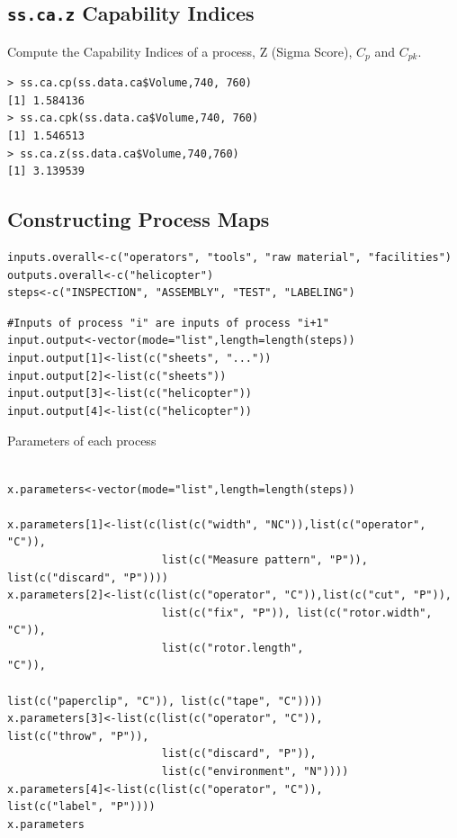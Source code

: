 \documentclass[]{article}
\begin{document}
\subsection{\texttt{ss.ca.z} Capability Indices}

Compute the Capability Indices of a process, Z (Sigma Score), $C_p$ and $C_{pk}$.
\begin{verbatim}
> ss.ca.cp(ss.data.ca$Volume,740, 760)
[1] 1.584136
> ss.ca.cpk(ss.data.ca$Volume,740, 760)
[1] 1.546513
> ss.ca.z(ss.data.ca$Volume,740,760)
[1] 3.139539
\end{verbatim}



\newpage
\subsection{Constructing Process Maps}
\begin{framed}
\begin{verbatim}
inputs.overall<-c("operators", "tools", "raw material", "facilities")
outputs.overall<-c("helicopter")
steps<-c("INSPECTION", "ASSEMBLY", "TEST", "LABELING")
\end{verbatim}
\end{framed}

\begin{framed}
\begin{verbatim}
#Inputs of process "i" are inputs of process "i+1"
input.output<-vector(mode="list",length=length(steps))
input.output[1]<-list(c("sheets", "..."))
input.output[2]<-list(c("sheets"))
input.output[3]<-list(c("helicopter"))
input.output[4]<-list(c("helicopter"))
\end{verbatim}
\end{framed}
Parameters of each process
\begin{framed}
\begin{verbatim}

x.parameters<-vector(mode="list",length=length(steps))

x.parameters[1]<-list(c(list(c("width", "NC")),list(c("operator", "C")),
                        list(c("Measure pattern", "P")), list(c("discard", "P"))))
x.parameters[2]<-list(c(list(c("operator", "C")),list(c("cut", "P")),
                        list(c("fix", "P")), list(c("rotor.width", "C")),
                        list(c("rotor.length",                                                                                "C")), 
                                                                                list(c("paperclip", "C")), list(c("tape", "C"))))
x.parameters[3]<-list(c(list(c("operator", "C")),
list(c("throw", "P")),
                        list(c("discard", "P")), 
                        list(c("environment", "N"))))
x.parameters[4]<-list(c(list(c("operator", "C")),
list(c("label", "P"))))
x.parameters

\end{verbatim}
\end{framed}
\end{document}
